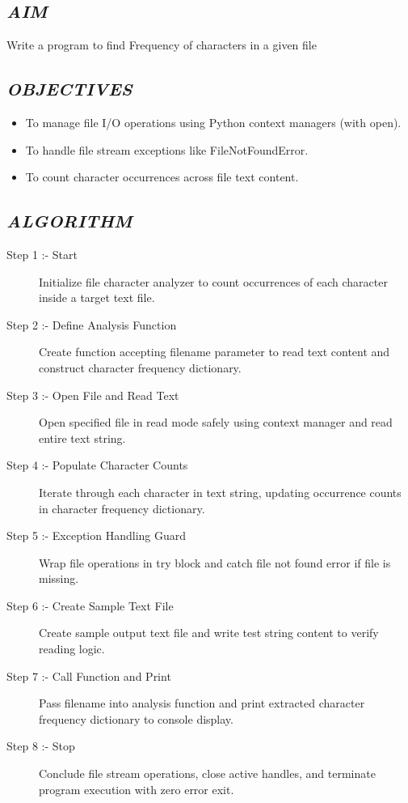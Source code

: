 \documentclass[11pt,a4paper]{article}
\begin{document}
\subsection*{\textit{AIM}}
Write a program to find Frequency of characters in a given file

\subsection*{\textit{OBJECTIVES}}
\begin{itemize}
  \item To manage file I/O operations using Python context managers (with open).
  \item To handle file stream exceptions like FileNotFoundError.
  \item To count character occurrences across file text content.
\end{itemize}

\subsection*{\textit{ALGORITHM}}
\begin{description}
  \item[Step 1 :- Start] Initialize file character analyzer to count occurrences of each character inside a target text file.
  \item[Step 2 :- Define Analysis Function] Create function accepting filename parameter to read text content and construct character frequency dictionary.
  \item[Step 3 :- Open File and Read Text] Open specified file in read mode safely using context manager and read entire text string.
  \item[Step 4 :- Populate Character Counts] Iterate through each character in text string, updating occurrence counts in character frequency dictionary.
  \item[Step 5 :- Exception Handling Guard] Wrap file operations in try block and catch file not found error if file is missing.
  \item[Step 6 :- Create Sample Text File] Create sample output text file and write test string content to verify reading logic.
  \item[Step 7 :- Call Function and Print] Pass filename into analysis function and print extracted character frequency dictionary to console display.
  \item[Step 8 :- Stop] Conclude file stream operations, close active handles, and terminate program execution with zero error exit.
\end{description}
\end{document}
